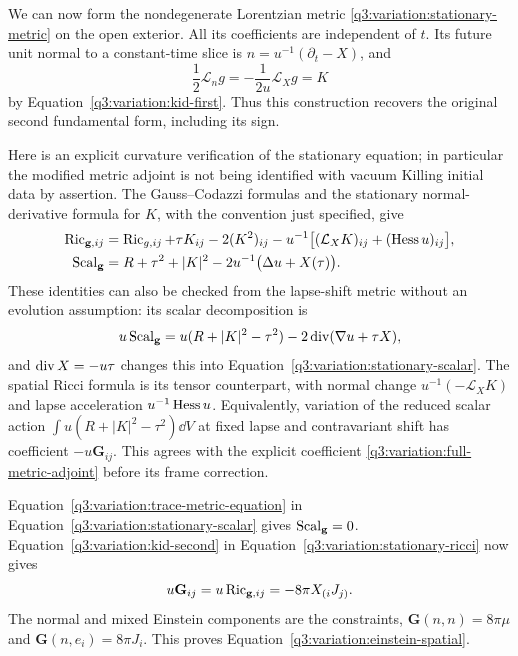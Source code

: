 We can now form the nondegenerate Lorentzian metric
\eqref{q3:variation:stationary-metric} on the open exterior.  All its
coefficients are independent of $t$.  Its future unit normal to a
constant-time slice is $n=u^{-1}(\partial_t-X)$, and
\[
 \frac12\mathcal L_n g
       =-\frac1{2u}\mathcal L_Xg=K
\]
by Equation~\eqref{q3:variation:kid-first}.  Thus this construction
recovers the original second fundamental form, including its sign.

Here is an explicit curvature verification of the stationary
equation; in particular the modified metric adjoint is not being
identified with vacuum Killing initial data by assertion.  The
Gauss--Codazzi formulas and the stationary normal-derivative formula
for $K$, with the convention just specified, give
\begin{align}
 \operatorname{Ric}_{\mathbf g,ij}
   &=\operatorname{Ric}_{g,ij}+\tau K_{ij}-2(K^2)_{ij}
       -u^{-1}\bigl[(\mathcal L_XK)_{ij}
                             +(\operatorname{Hess} u)_{ij}\bigr],
       \label{q3:variation:stationary-ricci}\\
 \operatorname{Scal}_{\mathbf g}
   &=R+\tau^2+|K|^2
             -2u^{-1}\bigl(\Delta u+X(\tau)\bigr).
       \label{q3:variation:stationary-scalar}
\end{align}
These identities can also be checked from the lapse-shift metric
without an evolution assumption: its scalar decomposition is
\[
 u\operatorname{Scal}_{\mathbf g}
  =u(R+|K|^2-\tau^2)
            -2\operatorname{div}(\nabla u+\tau X),
\]
and $\operatorname{div} X=-u\tau$ changes this into
Equation~\eqref{q3:variation:stationary-scalar}.  The spatial Ricci
formula is its tensor counterpart, with normal change
$u^{-1}(-\mathcal L_XK)$ and lapse acceleration $u^{-1}\operatorname{Hess} u$.
Equivalently, variation of the reduced scalar action
$\int u(R+|K|^2-\tau^2)\dd V$ at fixed lapse and contravariant
shift has coefficient $-u\mathbf G_{ij}$.
This agrees with the explicit coefficient
\eqref{q3:variation:full-metric-adjoint} before its frame correction.

Equation~\eqref{q3:variation:trace-metric-equation} in
Equation~\eqref{q3:variation:stationary-scalar} gives
$\operatorname{Scal}_{\mathbf g}=0$.  Equation~\eqref{q3:variation:kid-second} in
Equation~\eqref{q3:variation:stationary-ricci} now gives
\[
 u\mathbf G_{ij}=u\operatorname{Ric}_{\mathbf g,ij}
                  =-8\pi X_{(i}J_{j)}.
\]
The normal and mixed Einstein components are the constraints,
$\mathbf G(n,n)=8\pi\mu$ and
$\mathbf G(n,e_i)=8\pi J_i$.  This proves
Equation~\eqref{q3:variation:einstein-spatial}.

